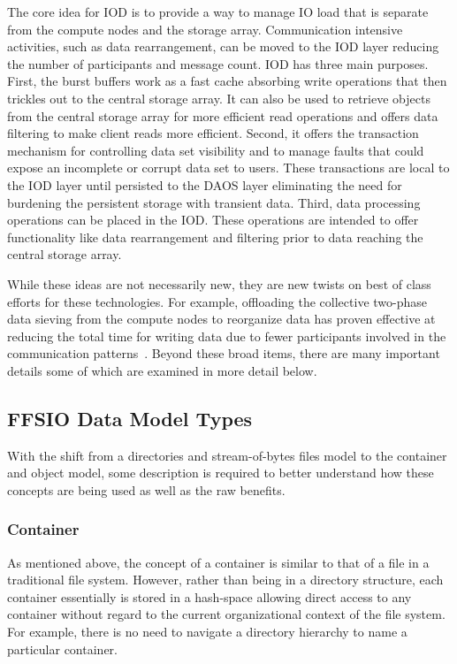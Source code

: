\documentclass[conference]{IEEEtran}
\begin{document}
The core idea for IOD is to provide a way to manage IO load that is
separate from the compute nodes and the storage array. Communication intensive
activities, such as data rearrangement, can be moved to the IOD layer
reducing the number of participants and message count. IOD has three main
purposes. First, the burst buffers work as a fast cache absorbing write
operations that then trickles out to the central storage array. It can also
be used to retrieve objects from the central storage array for more efficient
read operations and offers data filtering to make client reads more efficient.
Second, it offers the transaction mechanism for controlling data set visibility
and to manage faults that could expose an incomplete or corrupt data set to
users. These transactions are local to the IOD layer until persisted to the
DAOS layer eliminating the need for burdening the persistent storage with
transient data.  Third, data processing operations can be placed in the IOD.
These operations are intended to offer functionality like data rearrangement
and filtering prior to data reaching the central storage array.

While these ideas are not necessarily new, they are new twists on best of class
efforts for these technologies. For example, offloading the collective
two-phase data sieving from the compute nodes to reorganize data has proven
effective at reducing the total time for writing data due to fewer participants
involved in the communication patterns~\cite{lofstead:2011:nessie-staging}.
Beyond these broad items, there are many important details some of which are
examined in more detail below.

\subsection{FFSIO Data Model Types}
\label{sec:data-model}

With the shift from a directories and stream-of-bytes files model to the
container and object model, some description is required to better understand
how these concepts are being used as well as the raw benefits.

\subsubsection{Container}
As mentioned above, the concept of a container is similar to that of a file in
a traditional file system. However, rather than being in a directory structure,
each container essentially is stored in a hash-space allowing direct access to
any container without regard to the current organizational context of the
file system. For example, there is no need to navigate a directory hierarchy
to name a particular container.
\end{document}
